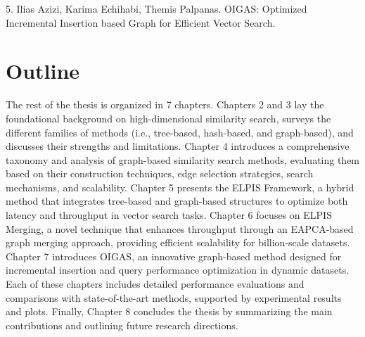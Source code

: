 5. Ilias Azizi, Karima Echihabi, Themis Palpanas. OIGAS: Optimized Incremental Insertion based Graph for Efficient Vector Search. 

\section{Outline}
The rest of the thesis is organized in 7 chapters. Chapters 2 and 3 lay the foundational background on high-dimensional similarity search, surveys the different families of methods (i.e., tree-based, hash-based, and graph-based), and discusses their strengths and limitations. Chapter 4 introduces a comprehensive taxonomy and analysis of graph-based similarity search methods, evaluating them based on their construction techniques, edge selection strategies, search mechanisms, and scalability. Chapter 5 presents the ELPIS Framework, a hybrid method that integrates tree-based and graph-based structures to optimize both latency and throughput in vector search tasks. Chapter 6 focuses on ELPIS Merging, a novel technique that enhances throughput through an EAPCA-based graph merging approach, providing efficient scalability for billion-scale datasets. Chapter 7 introduces OIGAS, an innovative graph-based method designed for incremental insertion and query performance optimization in dynamic datasets. Each of these chapters includes detailed performance evaluations and comparisons with state-of-the-art methods, supported by experimental results and plots. Finally, Chapter 8 concludes the thesis by summarizing the main contributions and outlining future research directions.
